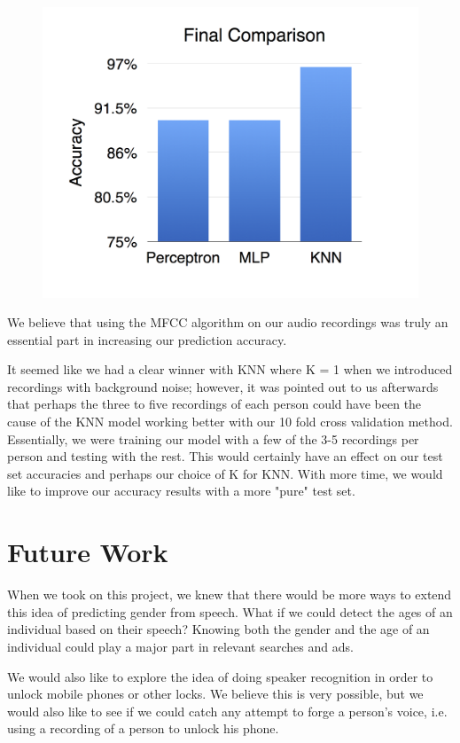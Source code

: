 \documentclass{article}
\begin{document}
\begin{figure}[H]
\includegraphics[width=\linewidth]{final_comparison}
\end{figure}

We believe that using the MFCC algorithm on our audio recordings was truly an essential part in increasing our prediction accuracy.

It seemed like we had a clear winner with KNN where K = 1 when we introduced recordings with background noise; however, it was pointed out to us afterwards that perhaps the three to five recordings of each person could have been the cause of the KNN model working better with our 10 fold cross validation method. Essentially, we were training our model with a few of the 3-5 recordings per person and testing with the rest. This would certainly have an effect on our test set accuracies and perhaps our choice of K for KNN. With more time, we would like to improve our accuracy results with a more "pure" test set.

\section{Future Work}

When we took on this project, we knew that there would be more ways to extend this idea of predicting gender from speech. What if we could detect the ages of an individual based on their speech? Knowing both the gender and the age of an individual could play a major part in relevant searches and ads.

We would also like to explore the idea of doing speaker recognition in order to unlock mobile phones or other locks. We believe this is very possible, but we would also like to see if we could catch any attempt to forge a person's voice, i.e. using a recording of a person to unlock his phone.
\end{document}
